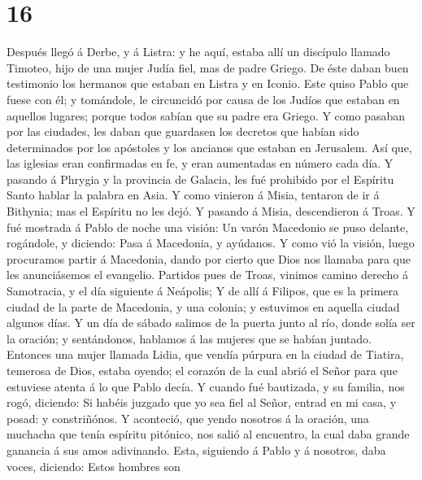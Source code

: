 \hypertarget{section-15}{%
\section{16}\label{section-15}}

 Después llegó á Derbe, y á Listra: y he aquí, estaba allí
un discípulo llamado Timoteo, hijo de una mujer Judía fiel, mas de padre
Griego.  De éste daban buen testimonio los hermanos que
estaban en Listra y en Iconio.  Este quiso Pablo que fuese
con él; y tomándole, le circuncidó por causa de los Judíos que estaban
en aquellos lugares; porque todos sabían que su padre era Griego.
 Y como pasaban por las ciudades, les daban que guardasen
los decretos que habían sido determinados por los apóstoles y los
ancianos que estaban en Jerusalem.  Así que, las iglesias
eran confirmadas en fe, y eran aumentadas en número cada día.
 Y pasando á Phrygia y la provincia de Galacia, les fué
prohibido por el Espíritu Santo hablar la palabra en Asia.
 Y como vinieron á Misia, tentaron de ir á Bithynia; mas
el Espíritu no les dejó.  Y pasando á Misia, descendieron
á Troas.  Y fué mostrada á Pablo de noche una visión: Un
varón Macedonio se puso delante, rogándole, y diciendo: Pasa á
Macedonia, y ayúdanos.  Y como vió la visión, luego
procuramos partir á Macedonia, dando por cierto que Dios nos llamaba
para que les anunciásemos el evangelio.  Partidos pues de
Troas, vinimos camino derecho á Samotracia, y el día siguiente á
Neápolis;  Y de allí á Filipos, que es la primera ciudad
de la parte de Macedonia, y una colonia; y estuvimos en aquella ciudad
algunos días.  Y un día de sábado salimos de la puerta
junto al río, donde solía ser la oración; y sentándonos, hablamos á las
mujeres que se habían juntado.  Entonces una mujer
llamada Lidia, que vendía púrpura en la ciudad de Tiatira, temerosa de
Dios, estaba oyendo; el corazón de la cual abrió el Señor para que
estuviese atenta á lo que Pablo decía.  Y cuando fué
bautizada, y su familia, nos rogó, diciendo: Si habéis juzgado que yo
sea fiel al Señor, entrad en mi casa, y posad: y constriñónos.
 Y aconteció, que yendo nosotros á la oración, una
muchacha que tenía espíritu pitónico, nos salió al encuentro, la cual
daba grande ganancia á sus amos adivinando.  Esta,
siguiendo á Pablo y á nosotros, daba voces, diciendo: Estos hombres son
